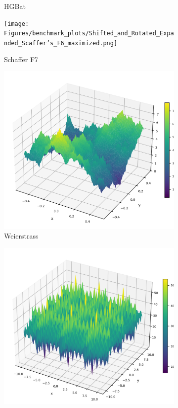 \begin{figure}[p]
\begin{subfigure}{0.32\textwidth}
        \caption{HGBat}
    \end{subfigure}
        \begin{subfigure}{0.32\textwidth}
        \centering
        \texttt{[image: Figures/benchmark\_plots/Shifted\_and\_Rotated\_Expanded\_Scaffer’s\_F6\_maximized.png]}
        \caption{Schaffer F7}
    \end{subfigure}
        \begin{subfigure}{0.32\textwidth}
        \centering
        \includegraphics[width=1\textwidth]{Figures/benchmark_plots/Shifted_and_Rotated_Weierstrass_maximized.png}
        \caption{Weierstrass}
    \end{subfigure}
    \begin{subfigure}{0.32\textwidth}
        \centering
        \includegraphics[width=1\textwidth]{Figures/benchmark_plots/Shubert_N3_maximized.png}

\end{subfigure}
\end{figure}

